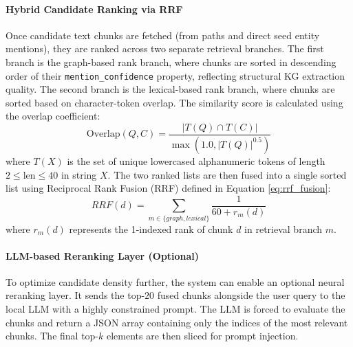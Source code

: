 \documentclass[../main.tex]{subfiles}
\begin{document}
\paragraph{Hybrid Candidate Ranking via RRF}
Once candidate text chunks are fetched (from paths and direct seed entity mentions), they are ranked across two separate retrieval branches. The first branch is the graph-based rank branch, where chunks are sorted in descending order of their \texttt{mention\_confidence} property, reflecting structural KG extraction quality. The second branch is the lexical-based rank branch, where chunks are sorted based on character-token overlap. The similarity score is calculated using the overlap coefficient:
\begin{equation}\label{eq:overlap_similarity}
\text{Overlap}(Q, C) = \frac{|T(Q) \cap T(C)|}{\max(1.0, |T(Q)|^{0.5})}
\end{equation}
where $T(X)$ is the set of unique lowercased alphanumeric tokens of length $2 \le \text{len} \le 40$ in string $X$.
The two ranked lists are then fused into a single sorted list using Reciprocal Rank Fusion (RRF) defined in Equation \eqref{eq:rrf_fusion}:
\begin{equation}\label{eq:rrf_fusion}
RRF(d) = \sum_{m \in \{graph, lexical\}} \frac{1}{60 + r_m(d)}
\end{equation}
where $r_m(d)$ represents the 1-indexed rank of chunk $d$ in retrieval branch $m$.

\paragraph{LLM-based Reranking Layer (Optional)}
To optimize candidate density further, the system can enable an optional neural reranking layer. It sends the top-$20$ fused chunks alongside the user query to the local LLM with a highly constrained prompt. The LLM is forced to evaluate the chunks and return a JSON array containing only the indices of the most relevant chunks. The final top-$k$ elements are then sliced for prompt injection.
\end{document}
